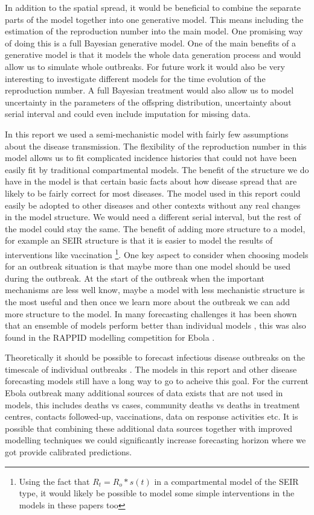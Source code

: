 \documentclass[12pt]{article}
\begin{document}
In addition to the spatial spread, it would be beneficial to combine the separate parts of the model together into one generative model. This means including the estimation of the reproduction number into the main model. One promising way of doing this is a full Bayesian generative model. One of the main benefits of a generative model is that it models the whole data generation process and would allow us to simulate whole outbreaks. For future work it would also be very interesting to investigate different models for the time evolution of the reproduction number. A full Bayesian treatment would also allow us to model uncertainty in the parameters of the offspring distribution, uncertainty about serial interval and could even include imputation for missing data. 

In this report we used a semi-mechanistic model with fairly few assumptions about the disease transmission. The flexibility of the reproduction number in this model allows us to fit complicated incidence histories that could not have been easily fit by traditional compartmental models. The benefit of the structure we do have in the model is that certain basic facts about how disease spread that are likely to be fairly correct for most diseases. The model used in this report could easily be adopted to other diseases and other contexts without any real changes in the model structure. We would need a different serial interval, but the rest of the model could stay the same. The benefit of adding more structure to a model, for example an SEIR structure is that it is easier to model the results of interventions like vaccination \footnote{Using the fact that $R_t=R_o*s(t)$ in a compartmental model of the SEIR type, it would likely be possible to model some simple interventions in the models in these papers too}. One key aspect to consider when choosing models for an outbreak situation is that maybe more than one model should be used during the outbreak. At the start of the outbreak when the important mechanisms are less well know, maybe a model with less mechanistic structure is the most useful and then once we learn more about the outbreak we can add more structure to the model. In many forecasting challenges it has been shown that an ensemble of models perform better than individual models \cite{dietterichEnsembleMethodsMachine2000}, this was also found in the RAPPID modelling competition for Ebola \cite{viboudRAPIDDEbolaForecasting2018}. 

Theoretically it should be possible to forecast infectious disease outbreaks on the timescale of individual outbreaks \cite{scarpinoPredictabilityInfectiousDisease2019}. The models in this report and other disease forecasting models still have a long way to go to acheive this goal. For the current Ebola outbreak many additional sources of data exists that are not used in models, this includes deaths vs cases, community deaths vs deaths in treatment centres, contacts followed-up, vaccinations, data on response activities etc. It is possible that combining these additional data sources together with improved modelling techniques we could significantly increase forecasting horizon where we got provide calibrated predictions. 
\end{document}
